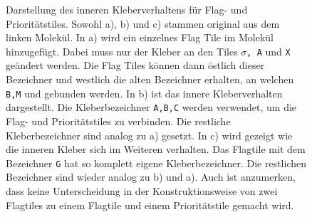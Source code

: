 \begin{figure}
    \centering
    \caption[Kleberverhalten beim Hinzufügen von Flag- und Prioritätstiles]{Darstellung des inneren Kleberverhaltens für Flag- und Prioritätstiles. Sowohl a), b) und c) stammen original aus dem linken Molekül. In a) wird ein einzelnes Flag Tile im Molekül hinzugefügt. Dabei muss nur der Kleber an den Tiles \texttt{$\sigma$, A} und \texttt{X} geändert werden. Die Flag Tiles können dann östlich dieser Bezeichner und westlich die alten Bezeichner erhalten, an welchen \texttt{B,M} und  gebunden werden. In b) ist das innere Kleberverhalten dargestellt. Die Kleberbezeichner \texttt{A,B,C} werden verwendet, um die Flag- und Prioritätstiles zu verbinden. Die restliche Kleberbezeichner sind analog zu a) gesetzt. In c) wird gezeigt wie die inneren Kleber sich im Weiteren verhalten. Das Flagtile mit dem Bezeichner \texttt{G} hat so komplett eigene Kleberbezeichner. Die restlichen Bezeichner sind wieder analog zu b) und a). Auch ist anzumerken, dass keine Unterscheidung in der Konstruktionsweise von zwei Flagtiles zu einem Flagtile und einem Prioritätstile gemacht wird.}
    \label{fig:flag_prio_glues}
\end{figure}

